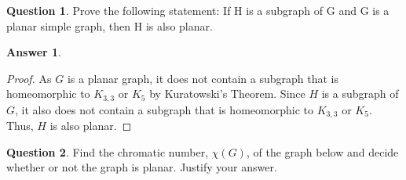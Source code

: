 \documentclass[article, 12pt]{article}
\theoremstyle{definition}
\newtheorem{question}{Question}
\newtheorem{answer}{Answer}
\begin{document}
    \begin{question}
        Prove the following statement: If H is a subgraph of G and G is a planar simple graph, then H is also planar.
    \end{question}

    \begin{answer}
        \begin{proof}
            As $G$ is a planar graph, it does not contain a subgraph that is homeomorphic to $K_{3,3}$ or $K_5$ by Kuratowski's Theorem. Since $H$ is a subgraph of $G$, it also does not contain a subgraph that is homeomorphic to $K_{3,3}$ or $K_5$. Thus, $H$ is also planar.
        \end{proof}
    \end{answer}
    \begin{question}
        Find the  chromatic number, $\chi(G)$, of the graph below  and decide whether or not the graph is planar. Justify your answer.  
        \begin{figure}[H]
        \hfil
        \end{figure}
    \end{question}
\end{document}
